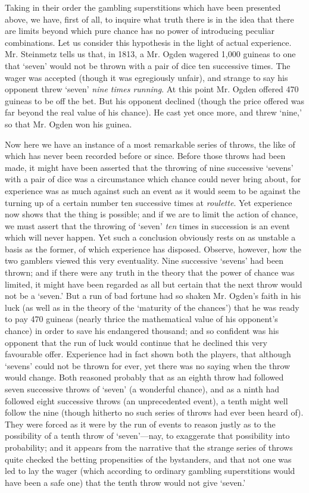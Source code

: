 \documentclass[letterpaper,12pt,oneside,openany]{memoir}
\begin{document}
Taking in their order the gambling superstitions
which have been presented above, we have, first of all,
to inquire what truth there is in the idea that there
are limits beyond which pure chance has no power of
introducing peculiar combinations. Let us consider
this hypothesis in the light of actual experience. Mr.
Steinmetz tells us that, in 1813, a Mr. Ogden wagered
1,000 guineas to one that `seven' would not be thrown
with a pair of dice ten successive times. The wager
was accepted (though it was egregiously unfair), and
strange to say his opponent threw `seven' \textit{nine times
running}. At this point Mr. Ogden offered 470 guineas
to be off the bet. But his opponent declined (though
the price offered was far beyond the real value of his
chance). He cast yet once more, and threw `nine,' so
that Mr. Ogden won his guinea.

Now here we have an instance of a most remarkable
series of throws, the like of which has never been
recorded before or since. Before those throws had
been made, it might have been asserted that the
throwing of nine successive `sevens' with a pair of
dice was a circumstance which chance could never
bring about, for experience was as much against such
an event as it would seem to be against the turning up
of a certain number ten successive times at \textit{roulette}.
Yet experience now shows that the thing is possible;
and if we are to limit the action of chance, we must
assert that the throwing of `seven' \textit{ten} times in succession
is an event which will never happen. Yet such
a conclusion obviously rests on as unstable a basis as
the former, of which experience has disposed. Observe,
however, how the two gamblers viewed this very eventuality.
Nine successive `sevens' had been thrown;
and if there were any truth in the theory that the
power of chance was limited, it might have been regarded
as all but certain that the next throw would
not be a `seven.' But a run of bad fortune had so
shaken Mr. Ogden's faith in his luck (as well as in the
theory of the `maturity of the chances') that he was
ready to pay 470 guineas (nearly thrice the mathematical
value of his opponent's chance) in order to
save his endangered thousand; and so confident was
his opponent that the run of luck would continue that
he declined this very favourable offer. Experience had
in fact shown both the players, that although `sevens'
could not be thrown for ever, yet there was no saying
when the throw would change. Both reasoned probably
that as an eighth throw had followed seven successive
throws of `seven' (a wonderful chance), and as a ninth
had followed eight successive throws (an unprecedented
event), a tenth might well follow the nine (though
hitherto no such series of throws had ever been heard
of). They were forced as it were by the run of events
to reason justly as to the possibility of a tenth throw
of `seven'---nay, to exaggerate that possibility into
probability; and it appears from the narrative that the
strange series of throws quite checked the betting propensities
of the bystanders, and that not one was led to
lay the wager (which according to ordinary gambling
superstitions would have been a safe one) that the tenth
throw would not give `seven.'
\end{document}
